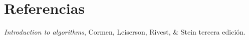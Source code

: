 \documentclass[twocolumn,11pts]{IEEEtran}
\begin{document}
\section{Referencias}
\textit {Introduction to algorithms}, Cormen, Leiserson, Rivest, \& Stein tercera edición.

%
%


\end{document}
